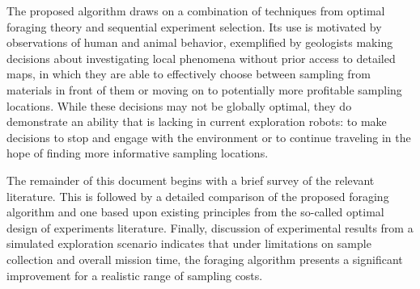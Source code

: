 The proposed algorithm draws on a combination of techniques from optimal foraging theory and sequential experiment selection.  Its use is motivated by observations of human and animal behavior, exemplified by geologists making decisions about investigating local phenomena without prior access to detailed maps, in which they are able to effectively choose between sampling from materials in front of them or moving on to potentially more profitable sampling locations.  While these decisions may not be globally optimal, they do demonstrate an ability that is lacking in current exploration robots: to make decisions to stop and engage with the environment or to continue traveling in the hope of finding more informative sampling locations.

The remainder of this document begins with a brief survey of the relevant literature.  This is followed by a detailed comparison of the proposed foraging algorithm and one based upon existing principles from the so-called optimal design of experiments literature.  Finally, discussion of experimental results from a simulated exploration scenario indicates that under limitations on sample collection and overall mission time, the foraging algorithm presents a significant improvement for a realistic range of sampling costs.


	
	


